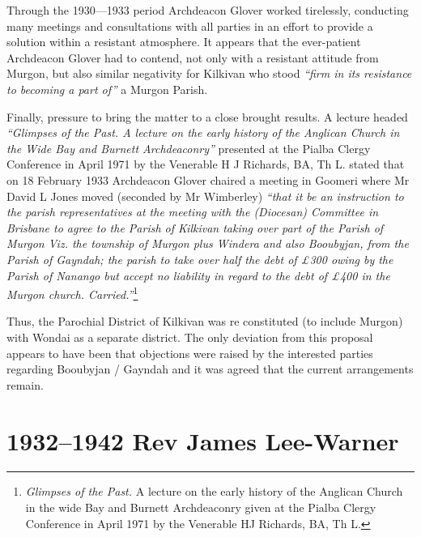 Through the 1930---1933 period Archdeacon Glover worked tirelessly, conducting many meetings and consultations with all parties in an effort to provide a solution within a resistant atmosphere. It appears that the ever-patient Archdeacon Glover had to contend, not only with a resistant attitude from Murgon, but also similar negativity for Kilkivan who stood \emph{``firm in its resistance to becoming a part of''} a Murgon Parish.



Finally, pressure to bring the matter to a close brought results. A lecture headed \emph{``Glimpses of the Past. A lecture on the early history of the Anglican Church in the Wide Bay and Burnett Archdeaconry''} presented at the Pialba Clergy Conference in April 1971 by the Venerable H J Richards, BA, Th L. stated that on 18 February 1933 Archdeacon Glover chaired a meeting in Goomeri where Mr David L Jones moved (seconded by Mr Wimberley) \emph{``that it be an instruction to the parish representatives at the meeting with the (Diocesan) Committee in Brisbane to agree to the Parish of Kilkivan taking over part of the Parish of Murgon Viz. the township of Murgon plus Windera and also Booubyjan, from the Parish of Gayndah; the parish to take over half the debt of \pounds300 owing by the Parish of Nanango but accept no liability in regard to the debt of \pounds400 in the Murgon church. Carried.''}\footnote{\emph{Glimpses of the Past.} A lecture on the early history of the Anglican Church in the wide Bay and Burnett Archdeaconry given at the Pialba Clergy Conference in April 1971 by the Venerable HJ Richards, BA, Th L.}


Thus, the Parochial District of Kilkivan was re constituted (to include Murgon) with Wondai as a separate district. The only deviation from this proposal appears to have been that objections were raised by the interested parties regarding Booubyjan / Gayndah and it was agreed that the current arrangements remain.



\balance


\printendnotes[custom]
\setcounter{endnote}{0}
\chapter{1932--1942 Rev James Lee-Warner}
\nobalance



